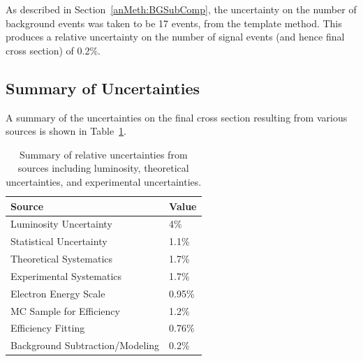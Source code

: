 
As described in Section~\ref{anMeth:BGSubComp}, 
the uncertainty on the number of background 
events was taken to be 17 events, 
from the template method.  
This produces a relative uncertainty 
on the number of signal events 
(and hence final cross section) 
of 0.2\%.  

\subsection{Summary of Uncertainties}
\label{anMeth:SystsSummary}

A summary of the uncertainties on the final 
cross section resulting from various sources 
is shown in Table~\ref{TableSystsSummary}.  

\begin{table}[htbp]
  \begin{center}
    \caption[Summary of uncertainties]{
      Summary of relative uncertainties from sources 
      including luminosity, theoretical uncertainties, 
      and experimental uncertainties.  
    }
    \label{TableSystsSummary}
    \begin{tabular}[]{ | l | l | }
      \hline
      Source & Value  \\ \hline \hline
      Luminosity Uncertainty & 4\% \\ \hline 
      Statistical Uncertainty & 1.1\% \\ \hline 
      Theoretical Systematics & 1.7\% \\ \hline \hline 
      Experimental Systematics & 1.7\% \\ \hline \hline 
      Electron Energy Scale & 0.95\% \\ \hline 
      MC Sample for Efficiency & 1.2\% \\ \hline 
      Efficiency Fitting & 0.76\% \\ \hline 
      Background Subtraction/Modeling & 0.2\% \\ \hline 
    \end{tabular}
  \end{center}
\end{table}


